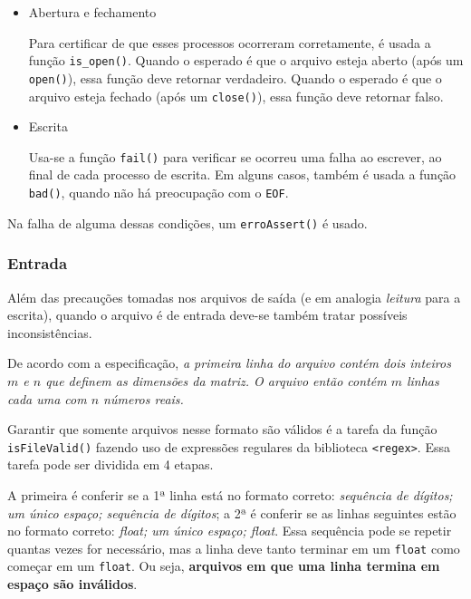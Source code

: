 \documentclass{article}
\def\code#1{\texttt{#1}}
\begin{document}
\begin{itemize}

    \item Abertura e fechamento 

        Para certificar de que esses processos ocorreram corretamente, é usada a função \code{is\_open()}. Quando o esperado é que o arquivo esteja aberto (após um \code{open()}), essa função deve retornar verdadeiro. Quando o esperado é que o arquivo esteja fechado (após um \code{close()}), essa função deve retornar falso. 

    \item Escrita

        Usa-se a função \code{fail()} para verificar se ocorreu uma falha ao escrever, ao final de cada processo de escrita. Em alguns casos, também é usada a função \code{bad()}, quando não há preocupação com o \code{EOF}.

\end{itemize}

Na falha de alguma dessas condições, um \code{erroAssert()} é usado.

\subsubsection{Entrada}

Além das precauções tomadas nos arquivos de saída (e em analogia \textit{leitura} para a escrita), quando o arquivo é de entrada deve-se também tratar possíveis inconsistências. 

De acordo com a especificação, \textit{a primeira linha do arquivo contém dois inteiros \( m \) e \( n \) que definem as dimensões da matriz. O arquivo então contém \( m \) linhas cada uma com \( n \) números reais.}

Garantir que somente arquivos nesse formato são válidos é a tarefa da função \code{isFileValid()} fazendo uso de expressões regulares da biblioteca \code{<regex>}. Essa tarefa pode ser dividida em 4 etapas. 

A primeira é conferir se a 1ª linha está no formato correto: \textit{sequência de dígitos; um único espaço; sequência de dígitos}; a 2ª é conferir se as linhas seguintes estão no formato correto: \textit{float; um único espaço; float}. Essa sequência pode se repetir quantas vezes for necessário, mas a linha deve tanto terminar em um \code{float} como começar em um \code{float}. Ou seja, \textbf{arquivos em que uma linha termina em espaço são inválidos}.
\end{document}
